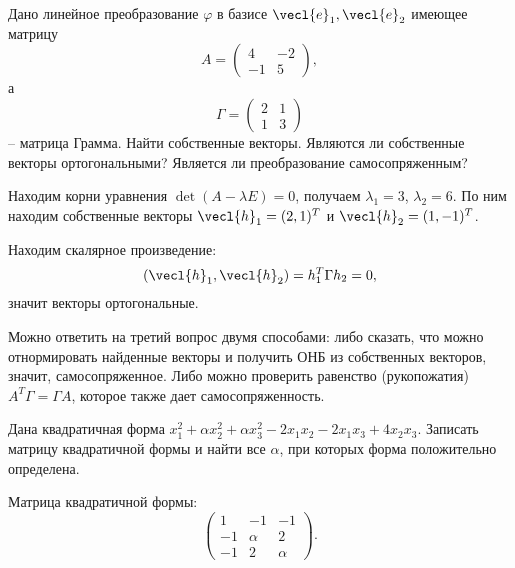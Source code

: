 \begin{task}
    Дано линейное преобразование $\varphi$ в базисе $\vecl{e}_1, \vecl{e}_2$ имеющее матрицу 
    \begin{equation*}
         A = \begin{pmatrix}
           4 & -2\\
           -1 & 5
        \end{pmatrix},
    \end{equation*}
    а
    \begin{equation*}
        \Gamma = \begin{pmatrix}
            2 & 1 \\ 1 & 3
        \end{pmatrix}
    \end{equation*} -- матрица Грамма.
    Найти собственные векторы. Являются ли собственные векторы ортогональными? Является ли преобразование самосопряженным?
\end{task}
Находим корни уравнения $\det(A - \lambda E) = 0$, получаем $\lambda_1 = 3$, $\lambda_2 = 6$. По ним находим собственные векторы $\vecl{h}_1 = (2, 1)^T$ и $\vecl{h}_2 = (1, -1)^T$.

Находим скалярное произведение:
\begin{equation*}
    (\vecl{h}_1, \vecl{h}_2) = h_1^T\Gamma h_2 = 0,
\end{equation*}
значит векторы ортогональные.

Можно ответить на третий вопрос двумя способами: либо сказать, что можно отнормировать найденные векторы и получить ОНБ из собственных векторов, значит, самосопряженное. Либо можно проверить равенство  (рукопожатия) $A^T\Gamma = \Gamma A$, которое также дает самосопряженность.

\begin{task}
    Дана квадратичная форма $x_1^2 + \alpha x_2^2 + \alpha x_3^2 - 2x_1x_2 - 2x_1x_3 + 4x_2x_3$. Записать матрицу квадратичной формы и найти все $\alpha$, при которых форма положительно определена.
\end{task}

Матрица квадратичной формы:
\begin{equation*}
   \begin{pmatrix}
         1 &-1 &-1\\
        -1 & \alpha & 2\\
        -1 & 2 & \alpha
   \end{pmatrix}.
\end{equation*}


